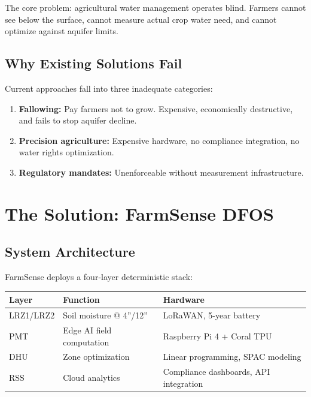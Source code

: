 \documentclass[10pt]{article}
\begin{document}
The core problem: agricultural water management operates blind. Farmers cannot see below the surface, cannot measure actual crop water need, and cannot optimize against aquifer limits.

\subsection{Why Existing Solutions Fail}

Current approaches fall into three inadequate categories:

\begin{enumerate}
    \item \textbf{Fallowing:} Pay farmers not to grow. Expensive, economically destructive, and fails to stop aquifer decline.
    \item \textbf{Precision agriculture:} Expensive hardware, no compliance integration, no water rights optimization.
    \item \textbf{Regulatory mandates:} Unenforceable without measurement infrastructure.
\end{enumerate}

\newpage

\section{The Solution: FarmSense DFOS}

\subsection{System Architecture}

FarmSense deploys a four-layer deterministic stack:

\begin{table}[h]
\centering
\begin{tabular}{@{}lll@{}}
\toprule
\textbf{Layer} & \textbf{Function} & \textbf{Hardware} \\
\midrule
LRZ1/LRZ2 & Soil moisture @ 4''/12'' & LoRaWAN, 5-year battery \\
PMT & Edge AI field computation & Raspberry Pi 4 + Coral TPU \\
DHU & Zone optimization & Linear programming, SPAC modeling \\
RSS & Cloud analytics & Compliance dashboards, API integration \\
\bottomrule
\end{tabular}
\end{table}
\end{document}
